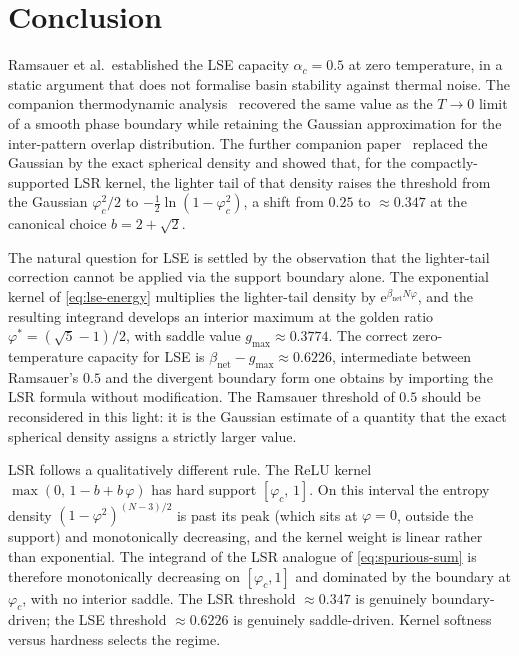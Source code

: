 \documentclass[11pt]{article}
\newcommand{\e}{{\mathrm{e}}}
\newcommand{\Bnet}{\beta_{\mathrm{net}}}
\begin{document}
\section{Conclusion}
\label{sec:conclusion}

Ramsauer et al.\ established the LSE capacity $\alpha_c = 0.5$ at zero
temperature, in a static argument that does not formalise basin stability
against thermal noise. The companion thermodynamic
analysis~\citep{icml2026theory} recovered the same value as the
$T\!\to\!0$ limit of a smooth phase boundary while retaining the Gaussian
approximation for the inter-pattern overlap distribution. The further
companion paper~\citep{petrova2026metastable} replaced the Gaussian by
the exact spherical density and showed that, for the compactly-supported
LSR kernel, the lighter tail of that density raises the threshold from
the Gaussian $\varphi_c^2/2$ to $-\tfrac12\ln(1-\varphi_c^2)$, a shift
from $0.25$ to $\approx 0.347$ at the canonical choice
$b = 2+\sqrt{2}$.

The natural question for LSE is settled by the observation that the
lighter-tail correction cannot be applied via the support boundary
alone. The exponential kernel of \eqref{eq:lse-energy} multiplies the
lighter-tail density by $\e^{\Bnet N \varphi}$, and the resulting
integrand develops an interior maximum at the golden ratio
$\varphi^{*} = (\sqrt{5}-1)/2$, with saddle value $g_{\max}\approx
0.3774$. The correct zero-temperature capacity for LSE is
$\Bnet - g_{\max}\approx 0.6226$, intermediate between Ramsauer's $0.5$
and the divergent boundary form one obtains by importing the LSR
formula without modification. The Ramsauer threshold of $0.5$ should be
reconsidered in this light: it is the Gaussian estimate of a quantity
that the exact spherical density assigns a strictly larger value.

LSR follows a qualitatively different rule. The ReLU kernel
$\max(0,\,1-b+b\,\varphi)$ has hard support $[\varphi_c,\,1]$. On this
interval the entropy density $(1-\varphi^2)^{(N-3)/2}$ is past its peak
(which sits at $\varphi=0$, outside the support) and monotonically
decreasing, and the kernel weight is linear rather than exponential. The
integrand of the LSR analogue of \eqref{eq:spurious-sum} is therefore
monotonically decreasing on $[\varphi_c, 1]$ and dominated by the
boundary at $\varphi_c$, with no interior saddle. The LSR threshold
$\approx 0.347$ is genuinely boundary-driven; the LSE threshold
$\approx 0.6226$ is genuinely saddle-driven. Kernel softness versus
hardness selects the regime.
\end{document}
